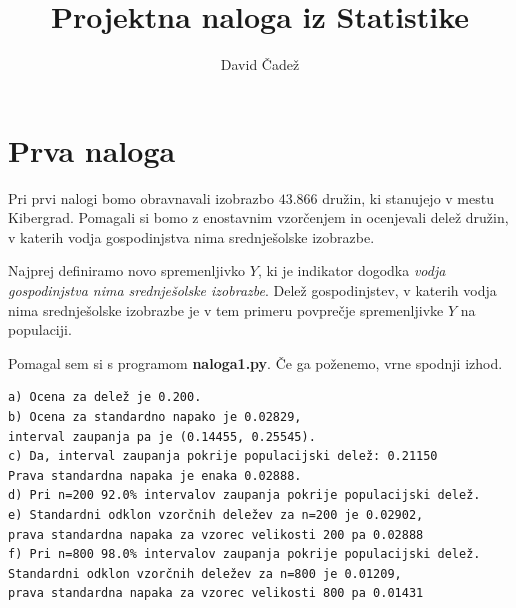 \documentclass{article}
\title{Projektna naloga iz Statistike}
\author{David Čadež}
\date{}
\begin{document}
\maketitle

\section{Prva naloga}

Pri prvi nalogi bomo obravnavali izobrazbo $43.866$ družin, ki stanujejo v mestu
Kibergrad. Pomagali si bomo z enostavnim vzorčenjem in ocenjevali delež družin,
v katerih vodja gospodinjstva nima srednješolske izobrazbe.

Najprej definiramo novo spremenljivko $Y$, ki je indikator dogodka \emph{vodja
gospodinjstva nima srednješolske izobrazbe}. Delež gospodinjstev, v katerih
vodja nima srednješolske izobrazbe je v tem primeru povprečje spremenljivke $Y$
na populaciji.

Pomagal sem si s programom \textbf{naloga1.py}. Če ga poženemo, vrne spodnji
izhod.
\begin{verbatim}
a) Ocena za delež je 0.200.
b) Ocena za standardno napako je 0.02829,
interval zaupanja pa je (0.14455, 0.25545).
c) Da, interval zaupanja pokrije populacijski delež: 0.21150
Prava standardna napaka je enaka 0.02888.
d) Pri n=200 92.0% intervalov zaupanja pokrije populacijski delež.
e) Standardni odklon vzorčnih deležev za n=200 je 0.02902,
prava standardna napaka za vzorec velikosti 200 pa 0.02888
f) Pri n=800 98.0% intervalov zaupanja pokrije populacijski delež.
Standardni odklon vzorčnih deležev za n=800 je 0.01209,
prava standardna napaka za vzorec velikosti 800 pa 0.01431
\end{verbatim}
\end{document}
